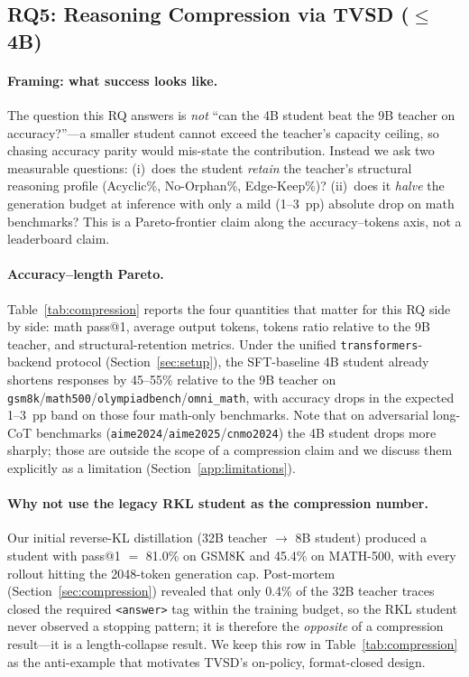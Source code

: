 \subsection{RQ5: Reasoning Compression via TVSD ($\le$4B)}
\label{sec:rq4}

\paragraph{Framing: what success looks like.}
The question this RQ answers is \emph{not} ``can the 4B student beat the
9B teacher on accuracy?''---a smaller student cannot exceed the teacher's
capacity ceiling, so chasing accuracy parity would mis-state the
contribution. Instead we ask two measurable questions:
(i)~does the student \emph{retain} the teacher's structural reasoning
profile (Acyclic\%, No-Orphan\%, Edge-Keep\%)?
(ii)~does it \emph{halve} the generation budget at inference with only a
mild (1--3~pp) absolute drop on math benchmarks?
This is a Pareto-frontier claim along the accuracy--tokens axis, not a
leaderboard claim.



\paragraph{Accuracy--length Pareto.}
Table~\ref{tab:compression} reports the four quantities that matter for
this RQ side by side: math pass@1, average output tokens, tokens ratio
relative to the 9B teacher, and structural-retention metrics.
Under the unified \texttt{transformers}-backend protocol
(Section~\ref{sec:setup}), the SFT-baseline 4B student already shortens
responses by 45--55\% relative to the 9B teacher on
\texttt{gsm8k}/\texttt{math500}/\texttt{olympiadbench}/\texttt{omni\_math},
with accuracy drops in the expected 1--3~pp band on those four math-only
benchmarks. Note that on adversarial long-CoT benchmarks
(\texttt{aime2024}/\texttt{aime2025}/\texttt{cnmo2024}) the 4B student
drops more sharply; those are outside the scope of a compression claim
and we discuss them explicitly as a limitation
(Section~\ref{app:limitations}).

\paragraph{Why not use the legacy RKL student as the compression number.}
Our initial reverse-KL distillation (32B teacher $\to$ 8B student)
produced a student with pass@1 $=$ 81.0\% on GSM8K and 45.4\% on
MATH-500, with every rollout hitting the 2048-token generation cap.
Post-mortem (Section~\ref{sec:compression}) revealed that only 0.4\%
of the 32B teacher traces closed the required \texttt{<answer>} tag
within the training budget, so the RKL student never observed a
stopping pattern; it is therefore the \emph{opposite} of a
compression result---it is a length-collapse result. We keep this
row in Table~\ref{tab:compression} as the anti-example that motivates
TVSD's on-policy, format-closed design.

